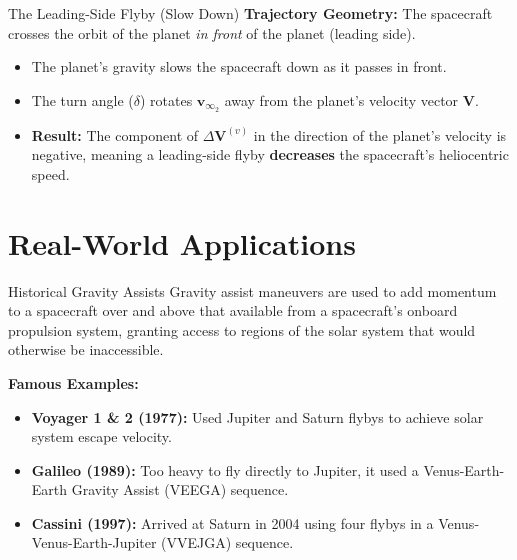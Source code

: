 \documentclass[11pt]{beamer}
\begin{document}
\begin{frame}{The Leading-Side Flyby (Slow Down)}
    \textbf{Trajectory Geometry:} The spacecraft crosses the orbit of the planet \textit{in front} of the planet (leading side).
    
    \vspace{0.2cm}
    \begin{itemize}
        \item The planet's gravity slows the spacecraft down as it passes in front.
        \item The turn angle ($\delta$) rotates $\bm{v}_{\infty_2}$ away from the planet's velocity vector $\bm{V}$.
        \item \textbf{Result:} The component of $\Delta \bm{V}^{(v)}$ in the direction of the planet's velocity is negative, meaning a leading-side flyby \textbf{decreases} the spacecraft's heliocentric speed.
    \end{itemize}
\end{frame}

\section{Real-World Applications}

\begin{frame}{Historical Gravity Assists}
    Gravity assist maneuvers are used to add momentum to a spacecraft over and above that available from a spacecraft's onboard propulsion system, granting access to regions of the solar system that would otherwise be inaccessible.
    
    \vspace{0.2cm}
    \textbf{Famous Examples:}
    \begin{itemize}
        \item \textbf{Voyager 1 \& 2 (1977):} Used Jupiter and Saturn flybys to achieve solar system escape velocity.
        \item \textbf{Galileo (1989):} Too heavy to fly directly to Jupiter, it used a Venus-Earth-Earth Gravity Assist (VEEGA) sequence.
        \item \textbf{Cassini (1997):} Arrived at Saturn in 2004 using four flybys in a Venus-Venus-Earth-Jupiter (VVEJGA) sequence.
    \end{itemize}
\end{frame}
\end{document}
